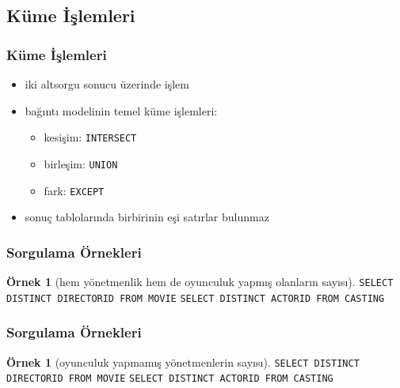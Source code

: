 \documentclass[dvipsnames]{beamer}
\theoremstyle{definition}
\theoremstyle{example}
\newtheorem{ornek}[theorem]{Örnek}
\theoremstyle{plain}
\begin{document}
\subsection{Küme İşlemleri}

\begin{frame}
  \frametitle{Küme İşlemleri}

  \begin{itemize}
    \item iki altsorgu sonucu üzerinde işlem

    \item bağıntı modelinin temel küme işlemleri:
    \begin{itemize}
      \item kesişim: \lstinline!INTERSECT!
      \item birleşim: \lstinline!UNION!
      \item fark: \lstinline!EXCEPT!
    \end{itemize}

    \pause
    \item sonuç tablolarında birbirinin eşi satırlar bulunmaz
  \end{itemize}
\end{frame}

\begin{frame}[fragile]
  \frametitle{Sorgulama Örnekleri}

  \begin{ornek}[hem yönetmenlik hem de oyunculuk yapmış olanların sayısı]
\lstinline!SELECT DISTINCT DIRECTORID FROM MOVIE!
\lstinline!SELECT DISTINCT ACTORID FROM CASTING!
  \end{ornek}
\end{frame}

\begin{frame}[fragile]
  \frametitle{Sorgulama Örnekleri}

  \begin{ornek}[oyunculuk yapmamış yönetmenlerin sayısı]
\lstinline!SELECT DISTINCT DIRECTORID FROM MOVIE!
\lstinline!SELECT DISTINCT ACTORID FROM CASTING!
  \end{ornek}
\end{frame}
\end{document}
